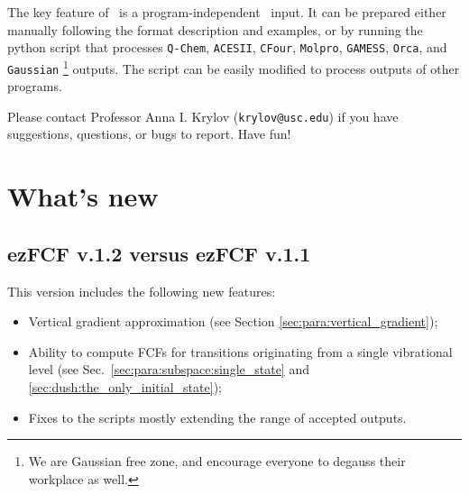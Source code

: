 \documentclass[11pt]{article}
\begin{document}
The key feature of \ezFCF\ is a program-independent \xml\ input. 
It can be prepared either manually following the format description and examples, 
or by running the python script that processes 
{\tt Q-Chem}, {\tt ACESII}, {\tt CFour}, {\tt Molpro}, {\tt GAMESS}, {\tt Orca}, and {\tt Gaussian}
\footnote{We are Gaussian free zone, and encourage everyone to degauss their workplace as well.} outputs.
The script can be easily modified to process outputs of other programs. 
 
Please contact Professor Anna I. Krylov ({\tt krylov@usc.edu})
if you have suggestions, questions, or bugs to report. Have fun!  

\section*{What's new}

\subsection*{ezFCF v.1.2 versus ezFCF v.1.1}
This version includes the following new features:
\begin{itemize}
\item Vertical gradient approximation (see Section \ref{sec:para:vertical_gradient});
\item Ability to compute FCFs for transitions originating from a single vibrational level (see Sec.~\ref{sec:para:subspace:single_state} and \ref{sec:dush:the_only_initial_state});
\item Fixes to the scripts mostly extending the range of accepted \abinitio{} outputs.
\end{itemize}  
\end{document}
